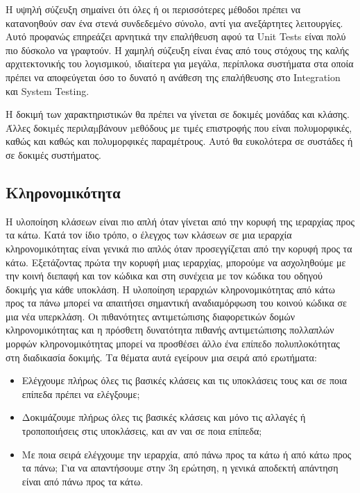 \documentclass[12pt]{article}
\begin{document}
\par Η υψηλή σύζευξη σημαίνει ότι όλες ή οι περισσότερες μέθοδοι πρέπει να κατανοηθούν σαν ένα στενά συνδεδεμένο σύνολο, αντί για ανεξάρτητες λειτουργίες. Αυτό προφανώς επηρεάζει αρνητικά την επαλήθευση αφού τα Unit Tests είναι πολύ πιο δύσκολο να γραφτούν. Η χαμηλή σύζευξη είναι ένας από τους στόχους της καλής αρχιτεκτονικής του λογισμικού, ιδιαίτερα για μεγάλα, περίπλοκα συστήματα στα οποία πρέπει να αποφεύγεται όσο το δυνατό η ανάθεση της επαλήθευσης στο Integration και System Testing.

\par Η δοκιμή των χαρακτηριστικών θα πρέπει να γίνεται σε δοκιμές μονάδας και κλάσης. Άλλες δοκιµές περιλαµβάνουν µεθόδους  με τιμές επιστροφής που είναι πολυμορφικές, καθώς και καθώς και πολυμορφικές παραμέτρους. Αυτό θα ευκολότερα σε συστάδες ή σε δοκιμές συστήματος.

\subsection{Κληρονομικότητα}

Η υλοποίηση κλάσεων είναι πιο απλή όταν γίνεται από την κορυφή της ιεραρχίας προς τα κάτω. Κατά τον ίδιο τρόπο, ο έλεγχος των κλάσεων σε μια ιεραρχία κληρονομικότητας είναι γενικά πιο απλός όταν προσεγγίζεται από την κορυφή προς τα κάτω. Εξετάζοντας πρώτα την κορυφή μιας ιεραρχίας, μπορούμε να ασχοληθούμε με την κοινή διεπαφή και τον κώδικα και στη συνέχεια με τον κώδικα του οδηγού δοκιμής για κάθε υποκλάση. Η υλοποίηση ιεραρχιών κληρονομικότητας από κάτω προς τα πάνω μπορεί να απαιτήσει σημαντική αναδιαμόρφωση του κοινού κώδικα σε μια νέα υπερκλάση. Οι πιθανότητες αντιμετώπισης διαφορετικών δομών κληρονομικότητας και η πρόσθετη δυνατότητα πιθανής αντιμετώπισης πολλαπλών μορφών κληρονομικότητας μπορεί να προσθέσει άλλο ένα επίπεδο πολυπλοκότητας στη διαδικασία δοκιμής. Τα θέματα αυτά εγείρουν μια σειρά από ερωτήματα:

\begin{itemize}
\item Ελέγχουμε πλήρως όλες τις βασικές κλάσεις και τις υποκλάσεις τους και σε ποια επίπεδα πρέπει να ελέγξουμε; 
\item Δοκιμάζουμε πλήρως όλες τις βασικές κλάσεις και μόνο τις αλλαγές ή τροποποιήσεις στις υποκλάσεις, και αν ναι σε ποια επίπεδα;
\item Με ποια σειρά ελέγχουμε την ιεραρχία, από πάνω προς τα κάτω ή από κάτω προς τα πάνω;
Για να απαντήσουμε στην 3η ερώτηση, η γενικά αποδεκτή απάντηση είναι από πάνω προς τα κάτω.
\end{itemize}
\end{document}
